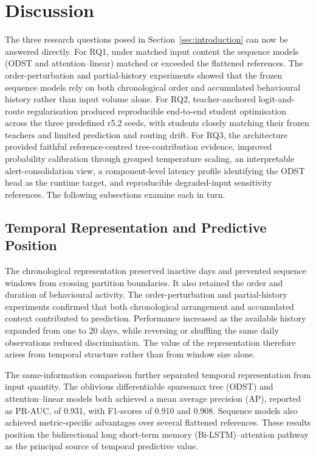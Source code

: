 \section{Discussion}
\label{sec:discussion}
The three research questions posed in Section~\ref{sec:introduction} can now
be answered directly. For RQ1, under matched input content the sequence
models (ODST and attention--linear) matched or exceeded the flattened
references. The order-perturbation and partial-history experiments
showed that the frozen sequence models rely on both chronological order and
accumulated behavioural history rather than input volume alone. For RQ2,
teacher-anchored logit-and-route regularisation produced reproducible
end-to-end student optimisation across the three predefined r5.2 seeds, with
students closely matching their frozen teachers and limited prediction and
routing drift. For RQ3, the architecture provided faithful reference-centred
tree-contribution evidence, improved probability calibration through grouped
temperature scaling, an interpretable alert-consolidation view, a
component-level latency profile identifying the ODST head as the runtime
target, and reproducible degraded-input sensitivity references. The
following subsections examine each in turn.

\subsection{Temporal Representation and Predictive Position}
\label{subsec:discussion_temporal}
The chronological representation preserved inactive days and prevented
sequence windows from crossing partition boundaries. It also retained the order
and duration of behavioural activity. The order-perturbation and
partial-history experiments confirmed that both chronological arrangement
and accumulated context contributed to prediction. Performance increased
as the available history expanded from one to 20 days, while reversing or
shuffling the same daily observations reduced discrimination. The value of
the representation therefore arises from temporal structure rather than
from window size alone.

\smallskip
The same-information comparison further separated temporal representation
from input quantity. The oblivious differentiable sparsemax tree (ODST) and
attention--linear models both achieved a mean average precision (AP),
reported as PR-AUC, of 0.931, with F1-scores of 0.910 and 0.908. Sequence
models also achieved metric-specific advantages over several flattened
references. These results position the bidirectional long short-term memory
(Bi-LSTM)--attention pathway as the principal source of temporal predictive
value.


